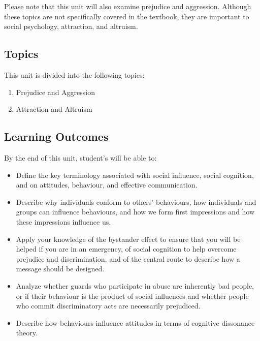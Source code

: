 \documentclass[
]{book}
\providecommand{\tightlist}{%
  \setlength{\itemsep}{0pt}\setlength{\parskip}{0pt}}
\begin{document}
Please note that this unit will also examine prejudice and aggression. Although these topics are not specifically covered in the textbook, they are important to social psychology, attraction, and altruism.

\hypertarget{topics-5}{%
\subsection*{Topics}\label{topics-5}}

This unit is divided into the following topics:

\begin{enumerate}
\def\labelenumi{\arabic{enumi}.}
\tightlist
\item
  Prejudice and Aggression\\
\item
  Attraction and Altruism
\end{enumerate}

\hypertarget{learning-outcomes-5}{%
\subsection*{Learning Outcomes}\label{learning-outcomes-5}}

By the end of this unit, student's will be able to:

\begin{itemize}
\tightlist
\item
  Define the key terminology associated with social influence, social cognition, and on attitudes, behaviour, and effective communication.\\
\item
  Describe why individuals conform to others' behaviours, how individuals and groups can influence behaviours, and how we form first impressions and how these impressions influence us.\\
\item
  Apply your knowledge of the bystander effect to ensure that you will be helped if you are in an emergency, of social cognition to help overcome prejudice and discrimination, and of the central route to describe how a message should be designed.\\
\item
  Analyze whether guards who participate in abuse are inherently bad people, or if their behaviour is the product of social influences and whether people who commit discriminatory acts are necessarily prejudiced.\\
\item
  Describe how behaviours influence attitudes in terms of cognitive dissonance theory.
\end{itemize}
\end{document}
